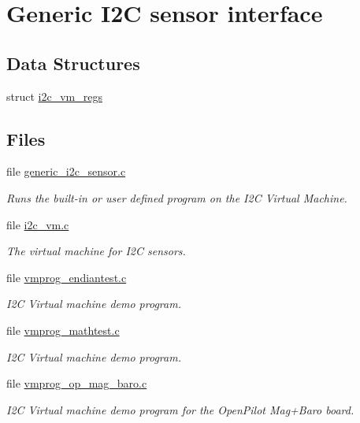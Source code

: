 \hypertarget{group___generic_i2_c_sensor}{\section{\-Generic \-I2\-C sensor interface}
\label{group___generic_i2_c_sensor}
}
\subsection*{\-Data \-Structures}
\begin{DoxyCompactItemize}
\item 
struct \hyperlink{structi2c__vm__regs}{i2c\-\_\-vm\-\_\-regs}
\end{DoxyCompactItemize}
\subsection*{\-Files}
\begin{DoxyCompactItemize}
\item 
file \hyperlink{generic__i2c__sensor_8c}{generic\-\_\-i2c\-\_\-sensor.\-c}
\begin{DoxyCompactList}\small\item\em \-Runs the built-\/in or user defined program on the \-I2\-C \-Virtual \-Machine. \end{DoxyCompactList}\item 
file \hyperlink{i2c__vm_8c}{i2c\-\_\-vm.\-c}
\begin{DoxyCompactList}\small\item\em \-The virtual machine for \-I2\-C sensors. \end{DoxyCompactList}\item 
file \hyperlink{vmprog__endiantest_8c}{vmprog\-\_\-endiantest.\-c}
\begin{DoxyCompactList}\small\item\em \-I2\-C \-Virtual machine demo program. \end{DoxyCompactList}\item 
file \hyperlink{vmprog__mathtest_8c}{vmprog\-\_\-mathtest.\-c}
\begin{DoxyCompactList}\small\item\em \-I2\-C \-Virtual machine demo program. \end{DoxyCompactList}\item 
file \hyperlink{vmprog__op__mag__baro_8c}{vmprog\-\_\-op\-\_\-mag\-\_\-baro.\-c}
\begin{DoxyCompactList}\small\item\em \-I2\-C \-Virtual machine demo program for the \-Open\-Pilot \-Mag+\-Baro board. \end{DoxyCompactList}\end{DoxyCompactItemize}
